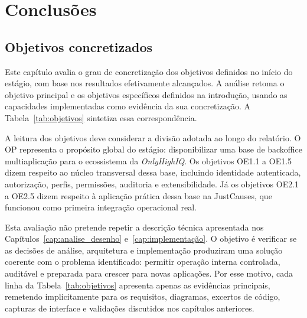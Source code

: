 \chapter{Conclusões}
\label{cap:conclusão}


\section{Objetivos concretizados}
\label{sec:objetivos_concretizados}

Este capítulo avalia o grau de concretização dos objetivos definidos no início do estágio, com base nos resultados efetivamente alcançados. A análise retoma o objetivo principal e os objetivos específicos definidos na introdução, usando as capacidades implementadas como evidência da sua concretização. A Tabela~\ref{tab:objetivos} sintetiza essa correspondência.

A leitura dos objetivos deve considerar a divisão adotada ao longo do relatório. O OP representa o propósito global do estágio: disponibilizar uma base de backoffice multiaplicação para o ecossistema da \textit{OnlyHighIQ}. Os objetivos OE1.1 a OE1.5 dizem respeito ao núcleo transversal dessa base, incluindo identidade autenticada, autorização, perfis, permissões, auditoria e extensibilidade. Já os objetivos OE2.1 a OE2.5 dizem respeito à aplicação prática dessa base na JustCauses, que funcionou como primeira integração operacional real.

Esta avaliação não pretende repetir a descrição técnica apresentada nos Capítulos~\ref{cap:analise_desenho} e~\ref{cap:implementação}. O objetivo é verificar se as decisões de análise, arquitetura e implementação produziram uma solução coerente com o problema identificado: permitir operação interna controlada, auditável e preparada para crescer para novas aplicações. Por esse motivo, cada linha da Tabela~\ref{tab:objetivos} apresenta apenas as evidências principais, remetendo implicitamente para os requisitos, diagramas, excertos de código, capturas de interface e validações discutidos nos capítulos anteriores.

